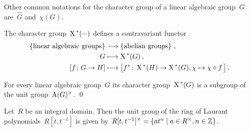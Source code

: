 \begin{remark}
  Other common notations for the character group of a linear algebraic group~$G$ are~$\widehat{G}$ and~$\chi(G)$.
\end{remark}


\begin{fluff}
  The character group~$\operatorname{X}^{\,*}(-)$ defines a contravariant functor
  \begin{align*}
    \left\{
      \text{linear algebraic groups}
    \right\}
    &\longrightarrow
    \left\{
      \text{abelian groups}
    \right\} \,,
    \\
                  G
    &\longmapsto  \operatorname{X}^{\,*}(G) \,,
    \\
                  [f \colon G \to H]
    &\longmapsto  \bigl[
                            f^*
                    \colon  \operatorname{X}^{\,*}(H)
                    \to     \operatorname{X}^{\,*}(G),
                            \chi
                    \mapsto \chi \circ f \,
                  \bigr] \,.
  \end{align*}
\end{fluff}


\begin{lemma}
  For every linear algebraic group~$G$ its character group~$\operatorname{X}^{\,*}(G)$ is a subgroup of the unit group~$\operatorname{A}(G)^\times$.
  \qed
\end{lemma}


\begin{lemma}
  \label{units of laurant polynomials}
  Let~$R$ be an integral domain.
  Then the unit group of the ring of Laurant polynomials~$R[t,t^{-1}]$ is given by~$R[t,t^{-1}]^\times = \{ a t^n \suchthat a \in R^\times, n \in \Integer\}$.
\end{lemma}


